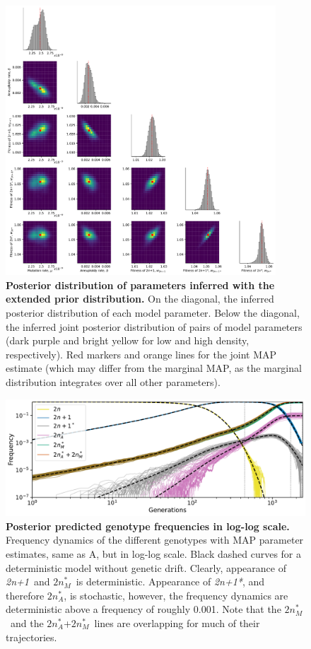 \documentclass[12pt]{extarticle}
\newcommand{\anwt}{\emph{2n+1}}
\newcommand{\eumtM}{\emph{$2n^*_M$}}
\newcommand{\eumtA}{\emph{$2n^*_A$}}
\newcommand{\anmt}{\emph{2n+1*}}
\begin{document}
\begin{figure}[p]
  \centering
  \includegraphics[width=0.9\textwidth]{../figures/posterior-alt.pdf}
  \caption{
  \textbf{Posterior distribution of parameters inferred with the extended prior distribution.}
On the diagonal, the inferred posterior distribution of each model parameter. 
Below the diagonal, the inferred joint posterior distribution of pairs of model parameters (dark purple and bright yellow for low and high density, respectively). Red markers and orange lines for the joint MAP estimate (which may differ from the marginal MAP, as the marginal distribution integrates over all other parameters).
} 
  \label{fig:posterior-alt}
\end{figure}


\begin{figure}[p]
    \centering
	\includegraphics[width=\textwidth]{../figures/MAP_freq_dynamics.pdf}
	\caption{\textbf{Posterior predicted genotype frequencies in log-log scale.}
	Frequency dynamics of the different genotypes with MAP parameter estimates, same as A, but in log-log scale. Black dashed curves for a deterministic model without genetic drift. 
	Clearly, appearance of \anwt\ and \eumtM\ is deterministic.
	Appearance of \anmt, and therefore \eumtA, is stochastic, however, the frequency dynamics are deterministic above a frequency of roughly 0.001. 
	Note that the \eumtM\ and the \eumtA+\eumtM\ lines are overlapping for much of their trajectories.
	}
    \label{fig:MAP_freq_dynamics_log}    
\end{figure}
\end{document}

